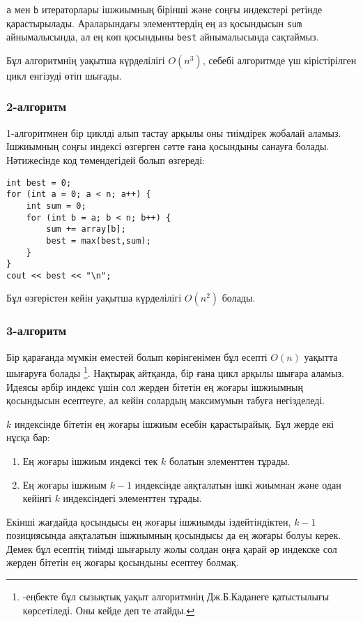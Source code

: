 \texttt{a} мен \texttt{b} итераторлары ішжиымның 
бірінші және соңғы индекстері ретінде қарастырылады.
Араларындағы элементтердің ең аз қосындысын \texttt{sum} айнымалысында, 
ал ең көп қосындыны \texttt{best} айнымалысында
 сақтаймыз. 

Бұл алгоритмнің уақытша күрделілігі $O(n^3)$, себебі 
алгоритмде үш кірістірілген цикл енгізуді өтіп шығады.

\subsubsection{2-алгоритм}

1-алгоритмнен бір циклді алып тастау арқылы оны тиімдірек 
жобалай аламыз. Ішжиымның соңғы индексі өзгерген сәтте
ғана қосындыны санауға болады.  
Нәтижесінде код төмендегідей болып өзгереді:

\begin{lstlisting}
int best = 0;
for (int a = 0; a < n; a++) {
    int sum = 0;
    for (int b = a; b < n; b++) {
        sum += array[b];
        best = max(best,sum);
    }
}
cout << best << "\n";
\end{lstlisting}
Бұл өзгерістен кейін уақытша күрделілігі $O(n^2)$ болады.

\subsubsection{3-алгоритм}

Бір қарағанда мүмкін еместей болып көрінгенімен бұл есепті $O(n)$ уақытта шығаруға болады
\footnote{\cite{ben86}-еңбекте бұл сызықтық уақыт алгоритмнің  Дж.Б.Каданеге қатыстылығы көрсетіледі.
Оны кейде  деп те атайды.}.
Нақтырақ айтқанда, бір ғана цикл арқылы шығара аламыз. Идеясы әрбір индекс үшін
сол жерден бітетін ең жоғары ішжиымның қосындысын есептеуге, ал кейін солардың
максимумын табуға негізделеді.

$k$ индексінде бітетін ең жоғары ішжиым есебін қарастырайық.
Бұл жерде екі нұсқа бар:
\begin{enumerate}
\item Ең жоғары ішжиым индексі тек $k$ болатын элементтен тұрады.
\item Ең жоғары ішжиым $k-1$ индексінде аяқталатын ішкі жиымнан және одан кейінгі $k$ индексіндегі элементтен тұрады.
\end{enumerate}

Екінші жағдайда қосындысы ең жоғары ішжиымды 
іздейтіндіктен, $k-1$ позициясында аяқталатын ішжиымның 
қосындысы да ең жоғары болуы керек.
Демек бұл есептің тиімді шығарылу жолы
солдан оңға қарай әр индекске сол жерден бітетін
ең жоғары қосындыны есептеу болмақ.

